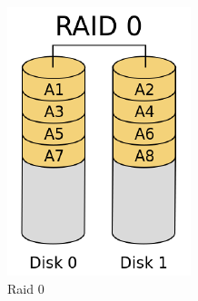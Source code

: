 \documentclass{article}
\begin{document}
\begin{itemize}
\begin{figure}[!htb]
  \includegraphics[width=\linewidth]{imgs/raid_0.png}
  \caption{Raid 0}\label{fig:raid_0}
\endminipage\hfill
{}

\end{figure}
\end{itemize}
\end{document}
